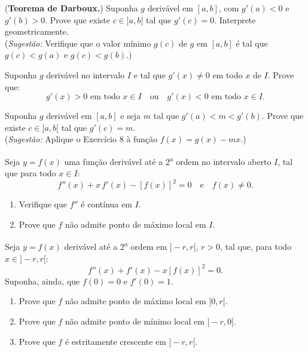 \begin{exercicio}[8]
(\textbf{Teorema de Darboux.}) Suponha $g$ derivável em $[a, b]$, com $g'(a) < 0$ e $g'(b) > 0$. Prove que existe $c \in {]a, b[}$ tal que $g'(c) = 0$. Interprete geometricamente.\\
(\textit{Sugestão:} Verifique que o valor mínimo $g(c)$ de $g$ em $[a, b]$ é tal que $g(c) < g(a)$ e $g(c) < g(b)$.)
\end{exercicio}

\begin{exercicio}[9]
Suponha $g$ derivável no intervalo $I$ e tal que $g'(x) \neq 0$ em todo $x$ de $I$. Prove que:
\[
g'(x) > 0 \text{ em todo } x \in I \quad\text{ou}\quad g'(x) < 0 \text{ em todo } x \in I.
\]
\end{exercicio}

\begin{exercicio}[10]
Suponha $g$ derivável em $[a, b]$ e seja $m$ tal que $g'(a) < m < g'(b)$. Prove que existe $c \in {]a, b[}$ tal que $g'(c) = m$.\\
(\textit{Sugestão:} Aplique o Exercício 8 à função $f(x) = g(x) - mx$.)
\end{exercicio}

\begin{exercicio}[11]
Seja $y = f(x)$ uma função derivável até a 2\textsuperscript{a} ordem no intervalo aberto $I$, tal que para todo $x \in I$:
\[
f''(x) + x\,f'(x) - [f(x)]^2 = 0 \quad\text{e}\quad f(x) \neq 0.
\]
\begin{enumerate}[label=\alph*)]
    \item Verifique que $f''$ é contínua em $I$.
    \item Prove que $f$ não admite ponto de máximo local em $I$.
\end{enumerate}
\end{exercicio}

\begin{exercicio}[12]
Seja $y = f(x)$ derivável até a 2\textsuperscript{a} ordem em ${]-r, r[}$, $r > 0$, tal que, para todo $x \in {]-r, r[}$:
\[
f''(x) + f'(x) - x[f(x)]^2 = 0.
\]
Suponha, ainda, que $f(0) = 0$ e $f'(0) = 1$.
\begin{enumerate}[label=\alph*)]
    \item Prove que $f$ não admite ponto de máximo local em ${]0, r[}$.
    \item Prove que $f$ não admite ponto de mínimo local em ${]-r, 0[}$.
    \item Prove que $f$ é estritamente crescente em ${]-r, r[}$.
\end{enumerate}
\end{exercicio}

